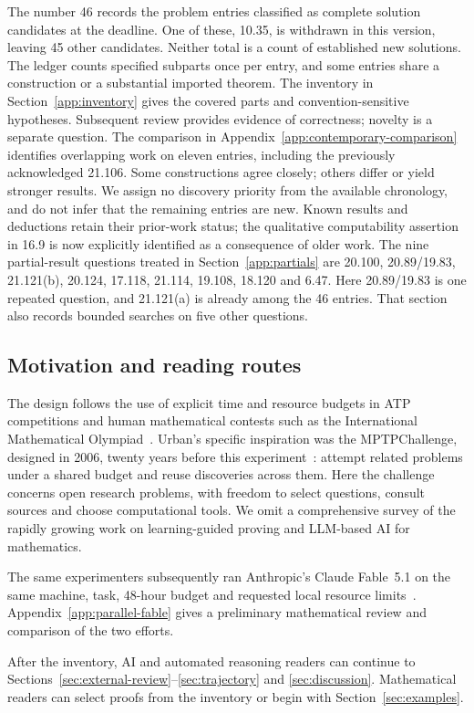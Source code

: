 The number 46 records the problem entries classified as complete solution
candidates at the deadline. One of these, 10.35, is withdrawn in this
version, leaving 45 other candidates. Neither total is a count of
established new solutions. The ledger counts specified subparts once per entry,
and some entries share a construction or a substantial imported theorem.
The inventory in Section~\ref{app:inventory} gives the covered parts and
convention-sensitive hypotheses. Subsequent review provides evidence of
correctness; novelty is a separate question. The comparison in
Appendix~\ref{app:contemporary-comparison} identifies overlapping work
on eleven entries, including the previously acknowledged 21.106.
Some constructions agree closely; others differ or yield stronger results.
We assign no discovery priority from the available chronology, and do not
infer that the remaining entries are new. Known results and deductions
retain their prior-work status; the qualitative computability assertion
in 16.9 is now explicitly identified as a consequence of older work.
The nine partial-result questions treated
in Section~\ref{app:partials} are 20.100, 20.89/19.83, 21.121(b), 20.124,
17.118, 21.114, 19.108, 18.120 and 6.47. Here 20.89/19.83 is one repeated
question, and 21.121(a) is already among the 46 entries. That section also
records bounded searches on five other questions.

\subsection{Motivation and reading routes}

The design follows the use of explicit time and resource budgets in ATP
competitions and human mathematical contests such as the International
Mathematical Olympiad~\cite{imo-regulations}. Urban's specific inspiration
was the MPTPChallenge, designed in 2006, twenty years before this
experiment~\cite{mptpchallenge}: attempt related problems under a shared
budget and reuse discoveries across them. Here the challenge concerns
open research problems, with freedom to select questions, consult sources
and choose computational tools. We omit a comprehensive survey of the
rapidly growing work on learning-guided proving and LLM-based AI for
mathematics.

The same experimenters subsequently ran Anthropic's Claude Fable~5.1
on the same machine, task, 48-hour budget and requested local resource
limits~\cite{fable-kourovka}. Appendix~\ref{app:parallel-fable} gives
a preliminary mathematical review and comparison of the two efforts.

After the inventory, AI and automated reasoning readers can continue to
Sections~\ref{sec:external-review}--\ref{sec:trajectory} and
\ref{sec:discussion}. Mathematical readers can select proofs from the
inventory or begin with Section~\ref{sec:examples}.

